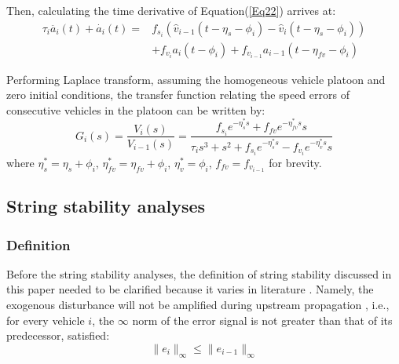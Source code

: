 \documentclass[journal]{IEEEtran}
\begin{document}
Then, calculating the time derivative of Equation(\ref{Eq22}) arrives at:
\begin{equation}
  \begin{aligned}
    \tau_i\ddot{a_i}\left(t\right)+\dot{a_i}\left(t\right)= & f_{s_i}\left({\hat{v}}_{i-1}\left(t-\eta_s-\phi_i\right)-{\hat{v}}_i\left(t-\eta_s-\phi_i\right)\right) \\
                                                            & +f_{v_i}a_i\left(t-\phi_i\right)+f_{v_{i-1}}a_{i-1}\left(t-\eta_{fv}-\phi_i\right)
  \end{aligned}
  \label{Eq23}
\end{equation}

Performing Laplace transform, assuming the homogeneous vehicle platoon and zero initial conditions, the transfer function relating the speed errors of consecutive vehicles in the platoon can be written by:
\begin{equation}
  G_i\left(s\right)=\frac{V_i\left(s\right)}{V_{i-1}\left(s\right)}=\frac{f_{s_i}e^{-\eta_s^\ast s}+f_{fv}e^{-\eta_{fv}^\ast s}s}{\tau_is^3+s^2+f_{s_i}e^{-\eta_s^\ast s}-f_{v_i}e^{-\eta_v^\ast s}s}
  \label{Eq24}
\end{equation}
where $\eta_s^\ast=\eta_s+\phi_i$, $\eta_{fv}^\ast=\eta_{fv}+\phi_i$, $\eta_v^\ast=\phi_i$, $f_{fv}=f_{v_{i-1}}$ for brevity.


\subsection{String stability analyses}
\label{Section 4.3}

\subsubsection{Definition}
\label{Section 4.3.1}

Before the string stability analyses, the definition of string stability discussed in this paper needed to be clarified because it varies in literature \citep{Wilson2008,Treiber2011,Ruan2021}. Namely, the exogenous disturbance will not be amplified during upstream propagation \citep{Montanino2021a,Qin2021,Jin2014}, i.e., for every vehicle $i$, the $\infty$ norm of the error signal is not greater than that of its predecessor, satisfied:
\begin{equation}
  \parallel {e_i}{\parallel _\infty } \leqslant \parallel {e_{i - 1}}{\parallel _\infty }
  \label{Eq25}
\end{equation}
\end{document}

